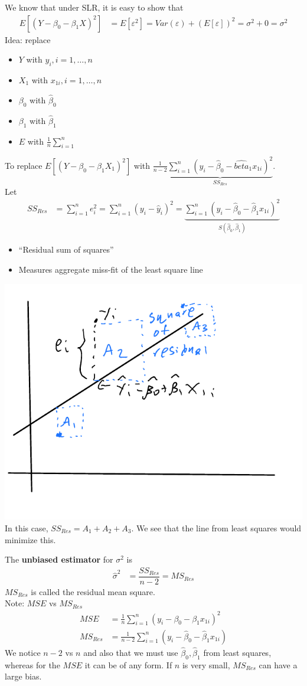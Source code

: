 \documentclass[12 pt]{article}
\begin{document}
We know that under SLR, it is easy to show that
\begin{align*}
  E[(Y - \beta_0 - \beta_1 X)^2] & = E[\varepsilon^2] = Var(\varepsilon) + (E[\varepsilon])^2
                                   = \sigma^2 + 0 = \sigma^2
\end{align*}
Idea: replace
\begin{itemize}
\item $Y$ with $y_i, i =1, \ldots, n$
\item $X_1$ with $x_{1i}, i = 1, \ldots, n$
\item $\beta_0$ with $\hat{\beta}_0$
\item $\beta_1$ with $\hat{\beta}_1$
\item $E$ with $\frac{1}{n} \sum_{i=1}^n$
\end{itemize}
To replace $E[(Y - \beta_0 - \beta_1 X_1)^2]$ with
$\frac{1}{n-2}\underbrace{\sum_{i=1}^n (y_i - \hat{\beta}_0 - \hat{beta}_1
x_{1i})^2}_{SS_{Res}}$.
\\ Let
\begin{align*}
  SS_{Res} & = \sum_{i=1}^n e_i^2 = \sum_{i=1}^n (y_i - \hat{y}_i)^2 = \underbrace{\sum_{i=1}^n (y_i - \hat{\beta}_0 - \hat{\beta}_1x_{1i})^2}_{S(\hat{\beta}_0, \hat{\beta}_1)}
\end{align*}
\begin{itemize}
\item ``Residual sum of squares''
\item Measures aggregate miss-fit of the least square line
\end{itemize}
\includegraphics[width=.6\textwidth]{13.pdf}
\\ In this case, $SS_{Res} = A_1 + A_2 + A_3$. We see that the line
from least squares would minimize this.

The \textbf{unbiased estimator} for $\sigma^2$ is
\begin{align*}
  \hat{\sigma}^2 & = \dfrac{SS_{Res}}{n-2} = MS_{Res}
\end{align*}
$MS_{Res}$ is called the residual mean square.
\\ Note: $MSE$ vs $MS_{Res}$
\begin{align*}
  MSE & = \frac{1}{n} \sum_{i=1}^n (y_i - \beta_0 - \beta_1 x_{1i})^2
  \\ MS_{Res} & = \frac{1}{n-2} \sum_{i=1}^n (y_i - \hat{\beta}_0 - \hat{\beta}_1 x_{1i})
\end{align*}
We notice $n-2$ vs $n$ and also that we must use $\hat{\beta}_0,
\hat{\beta}_1$ from least squares, whereas for the $MSE$ it can be of
any form. If $n$ is very small, $MS_{Res}$ can have a large bias.
\end{document}
